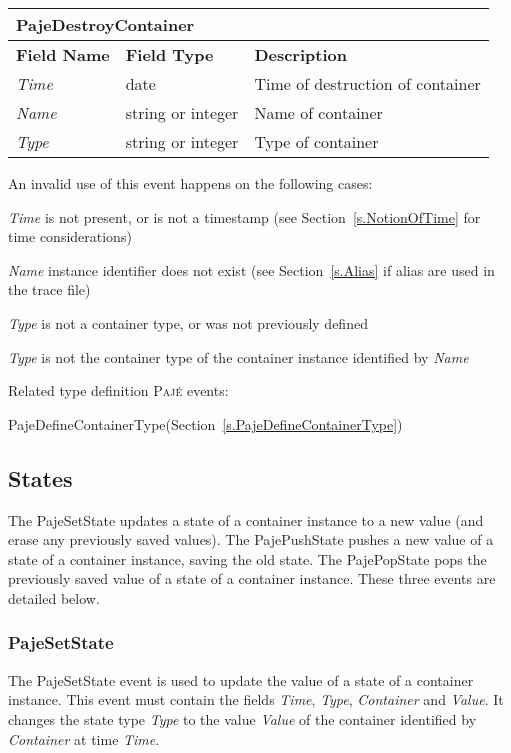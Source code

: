 \documentclass[12pt]{article}
\newcommand{\Paje}{\textsc{Paj\'e}\xspace}
\newcommand{\PajeField}[1]{\emph{#1}\xspace}
\newcommand{\Time}{\PajeField{Time}}
\newcommand{\Name}{\PajeField{Name}}
\newcommand{\Type}{\PajeField{Type}}
\newcommand{\Container}{\PajeField{Container}}
\newcommand{\Value}{\PajeField{Value}}
\newcommand{\PajeEvent}[1]{\textsf{#1}\xspace}
\newcommand{\PajeDefineContainerType}{\PajeEvent{PajeDefineContainerType}}
\newcommand{\PajeDestroyContainer}{\PajeEvent{PajeDestroyContainer}}
\newcommand{\PajeSetState}{\PajeEvent{PajeSetState}}
\newcommand{\PajePushState}{\PajeEvent{PajePushState}}
\newcommand{\PajePopState}{\PajeEvent{PajePopState}}
\newenvironment{itemize*}%
               {\vspace{-1em}
                 \begin{itemize}%
                   \setlength{\itemsep}{0pt}%
                   \setlength{\parskip}{0pt}}%
               {\end{itemize}}
\begin{document}
\begin{tabular}{|LLL|}
\hline
\multicolumn{3}{|T|}{\textbf{\PajeDestroyContainer}}\\\hline
\textbf{Field Name} & \textbf{Field Type} & \textbf{Description}\\
\hline
\Time          & date              & Time of destruction of container \\
\Name          & string or integer & Name of container \\
\Type          & string or integer & Type of container \\
\hline
\end{tabular}

An invalid use of this event happens on the following cases:
\begin{itemize*}
\item \Time is not present, or is not a timestamp (see Section~\ref{s.NotionOfTime} for time considerations)
\item \Name instance identifier does not exist (see Section~\ref{s.Alias} if alias are used in the trace file)
\item \Type is not a container type, or was not previously defined
\item \Type is not the container type of the container instance identified by \Name
\end{itemize*}

Related type definition \Paje events:
\begin{itemize*}
\item \PajeDefineContainerType (Section~\ref{s.PajeDefineContainerType})
\end{itemize*}

\subsection{States}
The \PajeSetState updates a state of a container instance to a new
value (and erase any previously saved values). The \PajePushState
pushes a new value of a state of a container instance, saving the old
state. The \PajePopState pops the previously saved value of a state of
a container instance.  These three events are detailed below.

\subsubsection{PajeSetState}
\label{s.PajeSetState}
The \PajeSetState event is used to update the value of a state of a
container instance. This event must contain the fields \Time, \Type,
\Container and \Value. It changes the state type \Type to the value
\Value of the container identified by \Container at time \Time.
\end{document}
